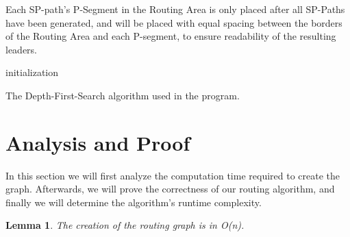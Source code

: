 \documentclass[11pt,a4paper]{vutinfth}
\newtheorem{lemma}{Lemma}
\begin{document}
Each SP-path's P-Segment in the Routing Area is only placed after all SP-Paths have been generated, and will be placed with equal spacing between the borders of the Routing Area and each P-segment, to ensure readability of the resulting leaders.

\begin{algorithm}

\DontPrintSemicolon
{}



initialization\;
\caption{The Depth-First-Search algorithm used in the program.}
\label{alg:DFS}
\end{algorithm}



\section{Analysis and Proof}

In this section we will first analyze the computation time required to create the graph. Afterwards, we will prove the correctness of our routing algorithm, and finally we will determine the algorithm's runtime complexity.

\begin{lemma}
	The creation of the routing graph is in O(n).
	\label{lem:GraphCreat}
\end{lemma}
\end{document}
